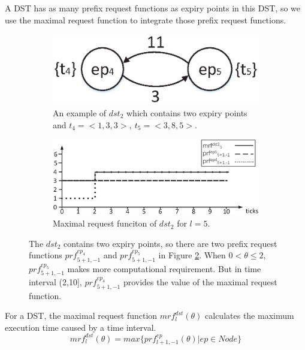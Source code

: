 \documentclass[sigconf]{acmart}
\begin{document}
A DST has as many prefix request functions as expiry points in this DST, so we use the maximal request function to integrate those prefix request functions.
\begin{figure}
  \centering
  \begin{subfigure}[t]{3.25in}
    \centering
    \includegraphics[scale=.45]{graphics/figure_dst2.eps}
    \caption{An example of $dst_2$ which contains two expiry points and $t_4=<1,3,3>,\ t_5=<3,8,5>$.}\label{figure_dst2}
  \end{subfigure}
  \quad
  \begin{subfigure}[t]{3.25in}
    \centering
    \includegraphics[scale=.325]{graphics/figure_mrf.eps}
    \caption{Maximal request funciton of $dst_2$ for $l=5$.}\label{figure_mrf}
  \end{subfigure}
  \caption{The $dst_2$ contains two expiry points, so there are two prefix request functions $prf^{ep_4}_{5+1,-1}$ and $prf^{ep_5}_{5+1,-1}$ in Figure \ref{figure_mrf}. When $0<\theta\leq2$, $prf^{ep_5}_{5+1,-1}$ makes more computational requirement. But in time interval (2,10], $prf^{ep_4}_{5+1,-1}$ provides the value of the maximal request function.}\label{figure_dst2_mrf}
\end{figure}
\begin{definition}
For a DST, the maximal request function $mrf^{dst}_l(\theta)$ calculates the maximum execution time caused by a time interval.%
\begin{equation}
mrf^{dst}_l(\theta)=max\{prf^{ep}_{l+1,-1}(\theta)|ep\in Node\}
\end{equation}\label{equation_mrf}
\end{definition}
\end{document}

